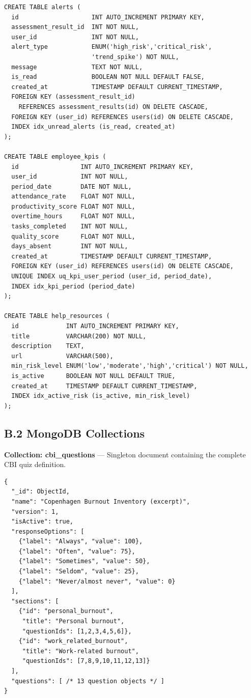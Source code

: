\documentclass[12pt,a4paper]{article}
\begin{document}
\begin{verbatim}
CREATE TABLE alerts (
  id                    INT AUTO_INCREMENT PRIMARY KEY,
  assessment_result_id  INT NOT NULL,
  user_id               INT NOT NULL,
  alert_type            ENUM('high_risk','critical_risk',
                        'trend_spike') NOT NULL,
  message               TEXT NOT NULL,
  is_read               BOOLEAN NOT NULL DEFAULT FALSE,
  created_at            TIMESTAMP DEFAULT CURRENT_TIMESTAMP,
  FOREIGN KEY (assessment_result_id)
    REFERENCES assessment_results(id) ON DELETE CASCADE,
  FOREIGN KEY (user_id) REFERENCES users(id) ON DELETE CASCADE,
  INDEX idx_unread_alerts (is_read, created_at)
);

CREATE TABLE employee_kpis (
  id                 INT AUTO_INCREMENT PRIMARY KEY,
  user_id            INT NOT NULL,
  period_date        DATE NOT NULL,
  attendance_rate    FLOAT NOT NULL,
  productivity_score FLOAT NOT NULL,
  overtime_hours     FLOAT NOT NULL,
  tasks_completed    INT NOT NULL,
  quality_score      FLOAT NOT NULL,
  days_absent        INT NOT NULL,
  created_at         TIMESTAMP DEFAULT CURRENT_TIMESTAMP,
  FOREIGN KEY (user_id) REFERENCES users(id) ON DELETE CASCADE,
  UNIQUE INDEX uq_kpi_user_period (user_id, period_date),
  INDEX idx_kpi_period (period_date)
);

CREATE TABLE help_resources (
  id             INT AUTO_INCREMENT PRIMARY KEY,
  title          VARCHAR(200) NOT NULL,
  description    TEXT,
  url            VARCHAR(500),
  min_risk_level ENUM('low','moderate','high','critical') NOT NULL,
  is_active      BOOLEAN NOT NULL DEFAULT TRUE,
  created_at     TIMESTAMP DEFAULT CURRENT_TIMESTAMP,
  INDEX idx_active_risk (is_active, min_risk_level)
);
\end{verbatim}

\subsection*{B.2 MongoDB Collections}

\textbf{Collection: cbi\_questions} --- Singleton document containing the
complete CBI quiz definition.

\begin{verbatim}
{
  "_id": ObjectId,
  "name": "Copenhagen Burnout Inventory (excerpt)",
  "version": 1,
  "isActive": true,
  "responseOptions": [
    {"label": "Always", "value": 100},
    {"label": "Often", "value": 75},
    {"label": "Sometimes", "value": 50},
    {"label": "Seldom", "value": 25},
    {"label": "Never/almost never", "value": 0}
  ],
  "sections": [
    {"id": "personal_burnout",
     "title": "Personal burnout",
     "questionIds": [1,2,3,4,5,6]},
    {"id": "work_related_burnout",
     "title": "Work-related burnout",
     "questionIds": [7,8,9,10,11,12,13]}
  ],
  "questions": [ /* 13 question objects */ ]
}
\end{verbatim}
\end{document}
